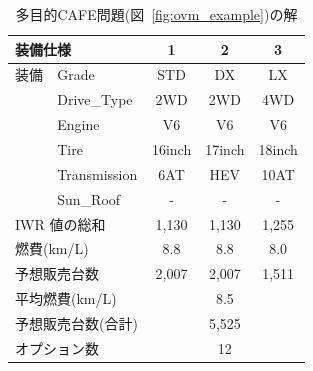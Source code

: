 

\begin{table}[t]
  \centering
  \caption{多目的CAFE問題(図~\ref{fig:ovm_example})の解}
  \begin{tabular}{l|l|c|c|c} \hline
    \multicolumn{2}{l|}{装備仕様}               & 1	& 2 	 & 3	\\  \hline
    装備 & \textsf{Grade}        & \textsf{STD}    & \textsf{DX}     & \textsf{LX}\\
    &\textsf{Drive\_Type}  & \textsf{2WD}    & \textsf{2WD}    & \textsf{4WD}\\
    &\textsf{Engine}	  & \textsf{V6}     & \textsf{V6}     & \textsf{V6}\\
    &\textsf{Tire}	  & \textsf{16inch} & \textsf{17inch} & \textsf{18inch}\\
    &\textsf{Transmission} & \textsf{6AT}    & \textsf{HEV}    & \textsf{10AT}\\
    &\textsf{Sun\_Roof}    & -               & -              & -  \\ \hline
    \multicolumn{2}{l|}{IWR 値の総和}           & 1,130  & 1,130   & 1,255 \\ %
    \multicolumn{2}{l|}{燃費(km/L)}      & 8.8  & 8.8     & 8.0 \\ %
    \multicolumn{2}{l|}{予想販売台数}    & 2,007   & 2,007   & 1,511  \\ \hline
    \multicolumn{2}{l|}{平均燃費(km/L)}  & \multicolumn{3}{c}{8.5} \\ 
    \multicolumn{2}{l|}{予想販売台数(合計)}  & \multicolumn{3}{c}{5,525} \\ 
    \multicolumn{2}{l|}{オプション数} & \multicolumn{3}{c}{12}	\\ \hline
 \end{tabular}
 \label{tab:ovm_ans}
\end{table}

